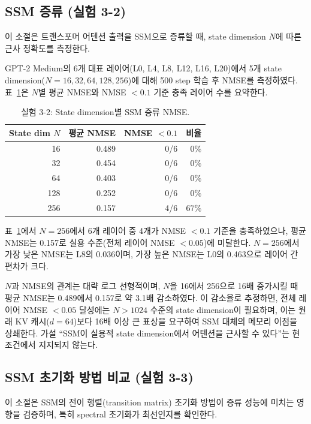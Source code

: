 \documentclass[11pt,a4paper]{article}
\begin{document}
\subsection{SSM 증류 (실험 3-2)}

이 소절은 트랜스포머 어텐션 출력을 SSM으로 증류할 때, state dimension $N$에 따른 근사 정확도를 측정한다.

GPT-2 Medium의 6개 대표 레이어(L0, L4, L8, L12, L16, L20)에서 5개 state dimension($N = 16, 32, 64, 128, 256$)에 대해 500 step 학습 후 NMSE를 측정하였다. 표~\ref{tab:exp32}은 $N$별 평균 NMSE와 NMSE $< 0.1$ 기준 충족 레이어 수를 요약한다.

\begin{table}[H]
\centering
\caption{실험 3-2: State dimension별 SSM 증류 NMSE.}
\label{tab:exp32}
\small
\begin{tabular}{rrrr}
\toprule
\textbf{State dim $N$} & \textbf{평균 NMSE} & \textbf{NMSE $< 0.1$} & \textbf{비율} \\
\midrule
16 & 0.489 & 0/6 & 0\% \\
32 & 0.454 & 0/6 & 0\% \\
64 & 0.403 & 0/6 & 0\% \\
128 & 0.252 & 0/6 & 0\% \\
256 & 0.157 & 4/6 & 67\% \\
\bottomrule
\end{tabular}
\end{table}

표~\ref{tab:exp32}에서 $N = 256$에서 6개 레이어 중 4개가 NMSE $< 0.1$ 기준을 충족하였으나, 평균 NMSE는 0.157로 실용 수준(전체 레이어 NMSE $< 0.05$)에 미달한다. $N = 256$에서 가장 낮은 NMSE는 L8의 0.036이며, 가장 높은 NMSE는 L0의 0.463으로 레이어 간 편차가 크다.

$N$과 NMSE의 관계는 대략 로그 선형적이며, $N$을 16에서 256으로 16배 증가시킬 때 평균 NMSE는 0.489에서 0.157로 약 3.1배 감소하였다. 이 감소율로 추정하면, 전체 레이어 NMSE $< 0.05$ 달성에는 $N > 1024$ 수준의 state dimension이 필요하며, 이는 원래 KV 캐시($d = 64$)보다 16배 이상 큰 표상을 요구하여 SSM 대체의 메모리 이점을 상쇄한다. 가설 ``SSM이 실용적 state dimension에서 어텐션을 근사할 수 있다''는 현 조건에서 지지되지 않는다.

\subsection{SSM 초기화 방법 비교 (실험 3-3)}

이 소절은 SSM의 전이 행렬(transition matrix) 초기화 방법이 증류 성능에 미치는 영향을 검증하며, 특히 spectral 초기화가 최선인지를 확인한다.
\end{document}
